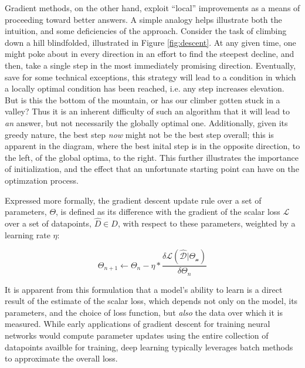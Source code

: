 Gradient methods, on the other hand, exploit ``local'' improvements as a means of proceeding toward better answers.
A simple analogy helps illustrate both the intuition, and some deficiencies of the approach.
Consider the task of climbing down a hill blindfolded, illustrated in Figure \ref{fig:descent}.
At any given time, one might poke about in every direction in an effort to find the steepest decline, and then, take a single step in the most immediately promising direction.
Eventually, save for some technical exceptions, this strategy will lead to a condition in which a locally optimal condition has been reached, i.e. any step increases elevation.
But is this the bottom of the mountain, or has our climber gotten stuck in a valley?
Thus it is an inherent difficulty of such an algorithm that it will lead to \emph{an} answer, but not necessarily the globally optimal one.
Additionally, given its greedy nature, the best step \emph{now} might not be the best step overall;
this is apparent in the diagram, where the best inital step is in the opposite direction, to the left, of the global optima, to the right.
This further illustrates the importance of initialization, and the effect that an unfortunate starting point can have on the optimzation process.

Expressed more formally, the gradient descent update rule over a set of parameters, $\Theta$, is defined as its difference with the gradient of the scalar loss $\mathcal{L}$ over a set of datapoints, $\hat{D} \in D$, with respect to these parameters, weighted by a learning rate $\eta$:

\begin{equation}
\label{eq:updaterule}
\Theta_{n+1} \leftarrow \Theta_n - \eta * \frac{ \delta \mathcal{L(\hat{D} | \Theta_n)}}{\delta \Theta_n}
\end{equation}

\noindent It is apparent from this formulation that a model's ability to learn is a direct result of the estimate of the scalar loss, which depends not only on the model, its parameters, and the choice of loss function, but \emph{also} the data over which it is measured.
While early applications of gradient descent for training neural networks would compute parameter updates using the entire collection of datapoints availble for training, deep learning typically leverages batch methods to approximate the overall loss.

